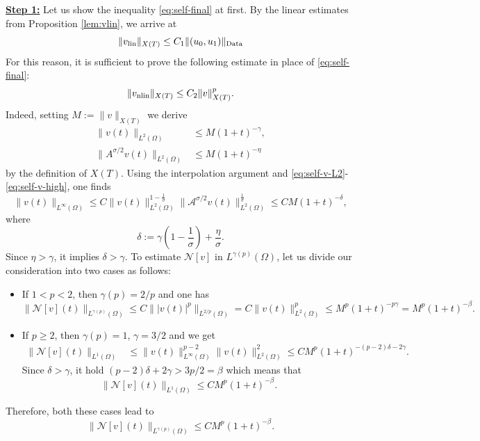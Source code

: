 \documentclass[a4paper,11pt]{article} %
\theoremstyle{remark}
\theoremstyle{definition}
\numberwithin{equation}{section}
\begin{document}
\noindent\textbf{\underline{Step 1:}} Let us show the inequality \eqref{eq:self-final} at first. By the linear estimates from Proposition \ref{lem:vlin}, we arrive at
\[
\|v_{\rm lin}\|_{X(T)}
\le
C_1 \|(u_0, u_1)\|_{\rm Data}
\]
For this reason, it is sufficient to prove the following estimate in place of \eqref{eq:self-final}:
\begin{equation} \label{eq:self-final-0}
    \|v_{\rm nlin}\|_{X(T)} \leq C_2\|v\|_{X(T)}^p.
\end{equation}
Indeed, setting $M:=\|v\|_{X(T)}$ we derive
\begin{align}
\|v(t)\|_{L^2(\Omega)}
&\le M(1+t)^{-\gamma},
\label{eq:self-v-L2}\\
\big\|A^{\sigma/2}v(t)\big\|_{L^2(\Omega)}
&\le M(1+t)^{-\eta}
\label{eq:self-v-high}
\end{align}
by the definition of \(X(T)\). Using the interpolation argument and \eqref{eq:self-v-L2}-\eqref{eq:self-v-high}, one finds
\begin{equation}\label{eq:self-v-inf}
\|v(t)\|_{L^\infty(\Omega)}
\le
C
\|v(t)\|_{L^2(\Omega)}^{1-\frac1\sigma}
\big\|\mathcal{A}^{\sigma/2}v(t)\big\|_{L^2(\Omega)}^{\frac1\sigma} \le
CM(1+t)^{-\delta},
\end{equation}
where
$$
\delta
:=
\gamma\left(1-\frac1\sigma\right)+\frac{\eta}{\sigma}.
$$
Since \(\eta>\gamma\), it implies $\delta>\gamma$. To estimate \(\mathcal{N}[v]\) in \(L^{\gamma(p)}(\Omega)\), let us divide our consideration into two cases as follows:
\begin{itemize}
    \item If \(1<p<2\), then \(\gamma(p)=2/p\) and one has
\[
\big\|\mathcal{N}[v](t)\big\|_{L^{\gamma(p)}(\Omega)}
\le C\big\||v(t)|^p\big\|_{L^{2/p}(\Omega)}
=
C\|v(t)\|_{L^2(\Omega)}^p
\le
M^p(1+t)^{-p\gamma}= M^p(1+t)^{-\beta}.
\]
    \item If \(p\ge2\), then \(\gamma(p)=1\), \(\gamma=3/2\) and we get
\begin{align*}
\big\|\mathcal{N}[v](t)\big\|_{L^1(\Omega)} &\le \|v(t)\|_{L^\infty(\Omega)}^{p-2} \|v(t)\|_{L^2(\Omega)}^2 \le CM^p (1+t)^{-(p-2)\delta- 2\gamma}.
\end{align*}
Since $\delta >\gamma$, it hold $(p-2)\delta +2\gamma
> 3p/2= \beta$ which means that 
\[
\big\|\mathcal{N}[v](t)\big\|_{L^1(\Omega)} \le CM^p(1+t)^{-\beta}.
\]
\end{itemize}
Therefore, both these cases lead to
\begin{equation}\label{eq:self-F-q}
\big\|\mathcal{N}[v](t)\big\|_{L^{\gamma(p)}(\Omega)}
\le
CM^p(1+t)^{-\beta}.
\end{equation} 
\end{document}
